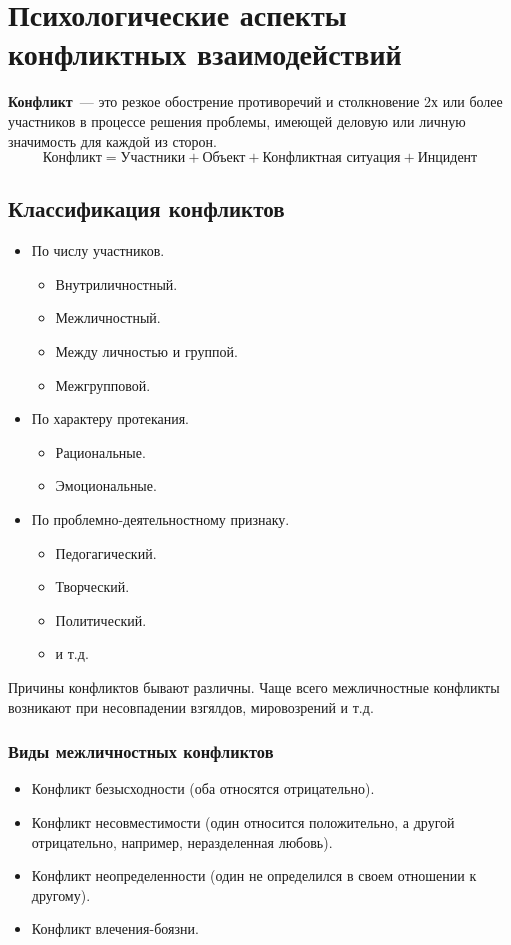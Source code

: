 \section{Психологические аспекты конфликтных взаимодействий}
\textbf{Конфликт}~--- это резкое обострение противоречий и столкновение 2х или более участников в процессе решения проблемы, имеющей деловую или личную значимость для каждой из сторон.
$$
	\text{Конфликт}=\text{Участники}+\text{Объект}+\text{Конфликтная ситуация}+\text{Инцидент}
$$

\subsection{Классификация конфликтов}
\begin{itemize}
	\item По числу участников.
	\begin{itemize}
		\item Внутриличностный.
		\item Межличностный.
		\item Между личностью и группой.
		\item Межгрупповой.
	\end{itemize}
	\item По характеру протекания.
	\begin{itemize}
		\item Рациональные.
		\item Эмоциональные.
	\end{itemize}
	\item По проблемно-деятельностному признаку.
	\begin{itemize}
		\item Педогагический.
		\item Творческий.
		\item Политический.
		\item и т.д.
	\end{itemize}
\end{itemize}

Причины конфликтов бывают различны. Чаще всего межличностные конфликты возникают при несовпадении взгялдов, мировозрений и т.д.

\subsubsection{Виды межличностных конфликтов}
\begin{itemize}
	\item Конфликт безысходности (оба относятся отрицательно).
	\item Конфликт несовместимости (один относится положительно, а другой отрицательно, например, неразделенная любовь).
	\item Конфликт неопределенности (один не определился в своем отношении к другому).
	\item Конфликт влечения-боязни.
\end{itemize}

